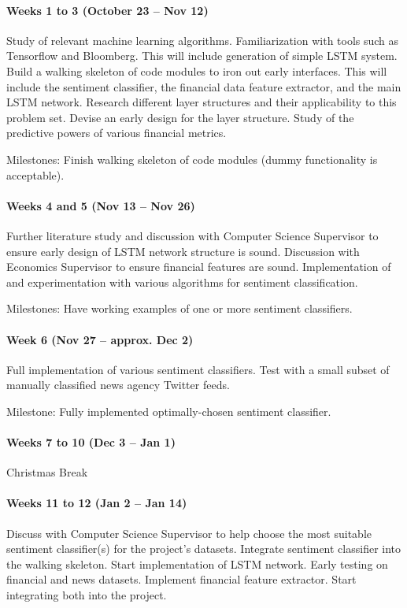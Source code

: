 \documentclass[12pt,a4paper,twoside,openright]{report}
\begin{document}
\paragraph{Weeks 1 to 3 (October 23 – Nov 12)}
Study of relevant machine learning algorithms. Familiarization with tools such as Tensorflow
and Bloomberg. This will include generation of simple LSTM system. Build a walking skeleton
of code modules to iron out early interfaces. This will include the sentiment classifier, the
financial data feature extractor, and the main LSTM network. Research different layer structures
and their applicability to this problem set. Devise an early design for the layer structure. Study of
the predictive powers of various financial metrics.

Milestones: Finish walking skeleton of code modules (dummy functionality is acceptable). 

\paragraph{Weeks 4 and 5 (Nov 13 – Nov 26)}
Further literature study and discussion with Computer Science Supervisor to ensure early design
of LSTM network structure is sound. Discussion with Economics Supervisor to ensure financial
features are sound. Implementation of and experimentation with various algorithms for sentiment
classification.

Milestones: Have working examples of one or more sentiment classifiers.

\paragraph{Week 6 (Nov 27 – approx. Dec 2)}
Full implementation of various sentiment classifiers. Test with a small subset of manually
classified news agency Twitter feeds.

Milestone: Fully implemented optimally-chosen sentiment classifier.

\paragraph{Weeks 7 to 10 (Dec 3 – Jan 1)}
Christmas Break

\paragraph{Weeks 11 to 12 (Jan 2 – Jan 14)}
Discuss with Computer Science Supervisor to help choose the most suitable sentiment
classifier(s) for the project’s datasets. Integrate sentiment classifier into the walking skeleton.
Start implementation of LSTM network. Early testing on financial and news datasets. Implement
financial feature extractor. Start integrating both into the project.
\end{document}
